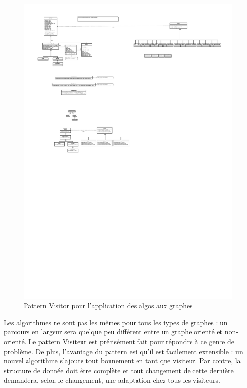 \documentclass[french]{article}
\begin{document}
			\begin{figure}[H]
				\centering
				\includegraphics[scale=2.4]{Conception/graph/visitor.pdf}
				\caption{Pattern Visitor pour l'application des algos aux graphes}
			\end{figure}
			
			Les algorithmes ne sont pas les mêmes pour tous les types de graphes : un parcours en largeur sera quelque peu différent entre un graphe orienté et non-orienté. Le pattern Visiteur est précisément fait pour répondre à ce genre de problème. De plus, l'avantage du pattern est qu'il est facilement extensible : un nouvel algorithme s'ajoute tout bonnement en tant que visiteur. Par contre, la structure de donnée doit être complète et tout changement de cette dernière demandera, selon le changement, une adaptation chez tous les visiteurs.\\
			
\end{document}
